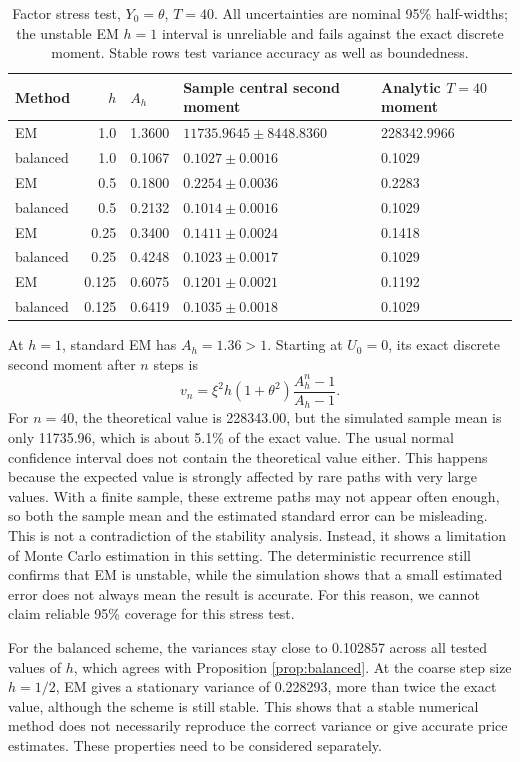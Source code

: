 \begin{table}[H]\centering\small
\caption{Factor stress test, $Y_0=\theta$, $T=40$. All uncertainties are nominal 95\% half-widths; the unstable EM $h=1$ interval is unreliable and fails against the exact discrete moment. Stable rows test variance accuracy as well as boundedness.}\label{tab:stress}
\begin{tabular}{lrlll}\toprule
Method & $h$ & $A_h$ & Sample central second moment & Analytic $T=40$ moment\\\midrule
EM & 1.0 & 1.3600 & $11735.9645\pm 8448.8360$ & 228342.9966\\
balanced & 1.0 & 0.1067 & $0.1027\pm 0.0016$ & 0.1029\\
EM & 0.5 & 0.1800 & $0.2254\pm 0.0036$ & 0.2283\\
balanced & 0.5 & 0.2132 & $0.1014\pm 0.0016$ & 0.1029\\
EM & 0.25 & 0.3400 & $0.1411\pm 0.0024$ & 0.1418\\
balanced & 0.25 & 0.4248 & $0.1023\pm 0.0017$ & 0.1029\\
EM & 0.125 & 0.6075 & $0.1201\pm 0.0021$ & 0.1192\\
balanced & 0.125 & 0.6419 & $0.1035\pm 0.0018$ & 0.1029\\
\bottomrule\end{tabular}\end{table}
At $h=1$, standard EM has $A_h=1.36>1$. Starting at $U_0=0$, its exact discrete second moment after $n$ steps is
\begin{equation}\label{eq:stressmean}
v_n=\xi^2h(1+\theta^2)\frac{A_h^n-1}{A_h-1}.
\end{equation}
For $n=40$, the theoretical value is 228343.00, but the simulated sample mean is only 11735.96, which is about 5.1\% of the exact value. The usual normal confidence interval does not contain the theoretical value either. This happens because the expected value is strongly affected by rare paths with very large values. With a finite sample, these extreme paths may not appear often enough, so both the sample mean and the estimated standard error can be misleading. This is not a contradiction of the stability analysis. Instead, it shows a limitation of Monte Carlo estimation in this setting. The deterministic recurrence still confirms that EM is unstable, while the simulation shows that a small estimated error does not always mean the result is accurate. For this reason, we cannot claim reliable 95\% coverage for this stress test.

For the balanced scheme, the variances stay close to 0.102857 across all tested values of $h$, which agrees with Proposition \ref{prop:balanced}. At the coarse step size $h=1/2$, EM gives a stationary variance of 0.228293, more than twice the exact value, although the scheme is still stable. This shows that a stable numerical method does not necessarily reproduce the correct variance or give accurate price estimates. These properties need to be considered separately.

